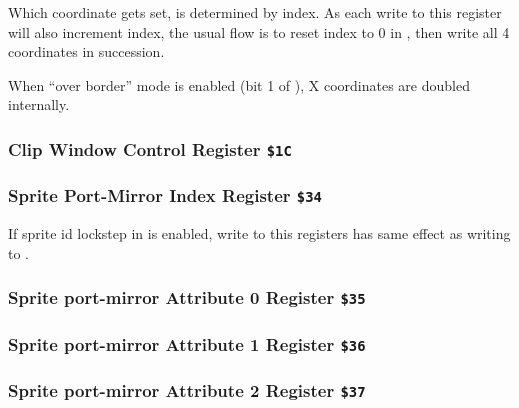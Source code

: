 \documentclass[12pt,twoside,openright,a4paper]{book}
\begin{document}
Which coordinate gets set, is determined by index. As each write to this register will also increment index, the usual flow is to reset index to 0 in , then write all 4 coordinates in succession.

When ``over border'' mode is enabled (bit 1 of ), X coordinates are doubled internally.


\subsubsection{Clip Window Control Register {\tt \$1C}}



\subsubsection{Sprite Port-Mirror Index Register {\tt \$34}}

If sprite id lockstep in  is enabled, write to this registers has same effect as writing to .

\begin{NextPort}
\end{NextPort}


\subsubsection{Sprite port-mirror Attribute 0 Register {\tt \$35}}

\begin{NextPort}
\end{NextPort}


\subsubsection{Sprite port-mirror Attribute 1 Register {\tt \$36}}

\begin{NextPort}
\end{NextPort}


\subsubsection{Sprite port-mirror Attribute 2 Register {\tt \$37}}
\end{document}

